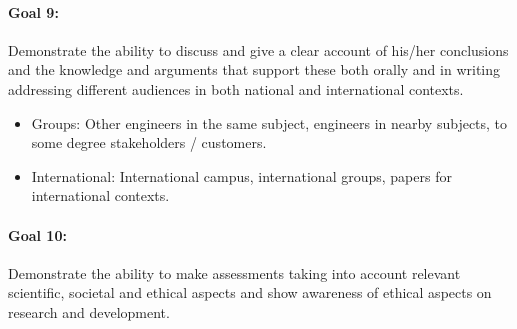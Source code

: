 % 
% 

\paragraph{Goal 9:} Demonstrate the ability to discuss and give a
clear account of his/her conclusions and the knowledge and arguments
that support these both orally and in writing addressing different
audiences in both national and international contexts.
\begin{itemize}
\item Groups: Other engineers in the same subject, engineers in nearby
  subjects, to some degree stakeholders / customers.
\item International: International campus, international groups,
  papers for international contexts.
\end{itemize}
% 
%
% 
% 

\paragraph{Goal 10:} Demonstrate the ability to make assessments
taking into account relevant scientific, societal and ethical aspects
and show awareness of ethical aspects on research and development.

